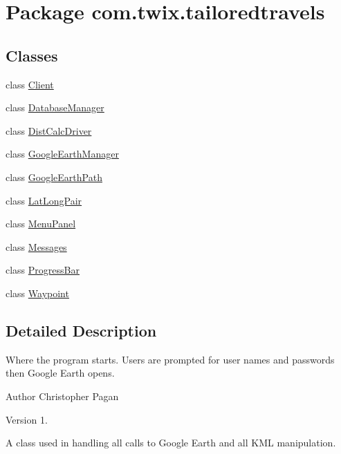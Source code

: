 \hypertarget{namespacecom_1_1twix_1_1tailoredtravels}{\section{Package com.\-twix.\-tailoredtravels}
\label{namespacecom_1_1twix_1_1tailoredtravels}
}
\subsection*{Classes}
\begin{DoxyCompactItemize}
\item 
class \hyperlink{classcom_1_1twix_1_1tailoredtravels_1_1_client}{Client}
\item 
class \hyperlink{classcom_1_1twix_1_1tailoredtravels_1_1_database_manager}{Database\-Manager}
\item 
class \hyperlink{classcom_1_1twix_1_1tailoredtravels_1_1_dist_calc_driver}{Dist\-Calc\-Driver}
\item 
class \hyperlink{classcom_1_1twix_1_1tailoredtravels_1_1_google_earth_manager}{Google\-Earth\-Manager}
\item 
class \hyperlink{classcom_1_1twix_1_1tailoredtravels_1_1_google_earth_path}{Google\-Earth\-Path}
\item 
class \hyperlink{classcom_1_1twix_1_1tailoredtravels_1_1_lat_long_pair}{Lat\-Long\-Pair}
\item 
class \hyperlink{classcom_1_1twix_1_1tailoredtravels_1_1_menu_panel}{Menu\-Panel}
\item 
class \hyperlink{classcom_1_1twix_1_1tailoredtravels_1_1_messages}{Messages}
\item 
class \hyperlink{classcom_1_1twix_1_1tailoredtravels_1_1_progress_bar}{Progress\-Bar}
\item 
class \hyperlink{classcom_1_1twix_1_1tailoredtravels_1_1_waypoint}{Waypoint}
\end{DoxyCompactItemize}


\subsection{Detailed Description}
Where the program starts. Users are prompted for user names and passwords then Google Earth opens.

\begin{DoxyAuthor}{Author}
Christopher Pagan 
\end{DoxyAuthor}
\begin{DoxyVersion}{Version}
1.
\end{DoxyVersion}
A class used in handling all calls to Google Earth and all K\-M\-L manipulation.

